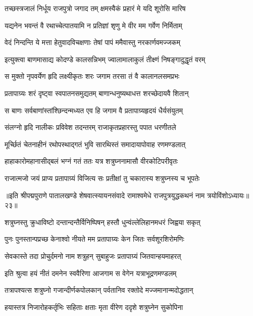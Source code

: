 \twolineshloka
{तच्छस्त्रजालं निर्धूय राजपुत्रो जगाद तम्}
{क्षमस्वैकं प्रहारं मे यदि शूरोसि मारिष}%

\twolineshloka
{यद्यनेन भवन्तं वै रथाच्चेत्पातयामि न}
{प्रतिज्ञां शृणु मे वीर मम गर्वेण निर्मिताम्}%

\twolineshloka
{वेदं निन्दन्ति ये मत्ता हेतुवादविचक्षणाः}
{तेषां पापं ममैवास्तु नरकार्णवमज्जकम्}%

\twolineshloka
{इत्युक्त्वा बाणमासाद्य कोदण्डे कालसन्निभम्}
{ज्वालामालाकुलं तीक्ष्णं निषङ्गादुद्धृतं वरम्}%

\twolineshloka
{स मुक्तो नृपवर्येण हृदि लक्ष्यीकृतः शरः}
{जगाम तरसा तं वै कालानलसमप्रभः}%

\twolineshloka
{प्रतापाग्र्यः शरं दृष्ट्वा स्वपातनसमुद्यतम्}
{बाणान्धनुष्यथाधत्त शरच्छेदायवै शितान्}%

\twolineshloka
{स बाणः सर्वबाणांस्तांश्छिन्दन्मध्यत एव हि}
{जगाम वै प्रतापाग्र्यहृदयं धैर्यसंयुतम्}%

\twolineshloka
{संलग्नो हृदि नालीकः प्रविवेश तदन्तरम्}
{राजाकृतप्रहारस्तु पपात धरणीतले}%

\twolineshloka
{मूर्च्छितं चेतनाहीनं रथोपस्थाद्गतं भुवि}
{सारथिस्तं समादायापोवाह रणमण्डलात्}%

\twolineshloka
{हाहाकारोमहानासीद्बलं भग्नं गतं ततः}
{यत्र शत्रुघ्ननामासौ वीरकोटिपरीवृतः}%

\twolineshloka
{राजात्मजो जयं प्राप्य प्रतापाग्र्यं विजित्य सः}
{प्रतीक्षां तु चकारास्य शत्रुघ्नस्य च भूपतेः}%

{॥इति श्रीपद्मपुराणे पातालखण्डे शेषवात्स्यायनसंवादे रामाश्वमेधे राजपुत्रयुद्धकथनं नाम त्रयोविंशोऽध्यायः॥२३॥}



\twolineshloka
{शत्रुघ्नस्तु क्रुधाविष्टो दन्तान्दन्तैर्विनिष्पिषन्}
{हस्तौ धुन्वंल्लेलिहानमधरं जिह्वया सकृत्}%

\twolineshloka
{पुनः पुनस्तान्पप्रच्छ केनाश्वो नीयते मम}
{प्रतापाग्र्यः केन जितः सर्वशूरशिरोमणिः}%

\twolineshloka
{सेवकास्ते तदा प्रोचुर्दमनो नाम शत्रुहन्}
{सुबाहुजः प्रतापाग्र्यं जितवान्हयमाहरत्}%

\twolineshloka
{इति श्रुत्वा हयं नीतं दमनेन स्ववैरिणा}
{आजगाम स वेगेन यत्राभूद्रणमण्डलम्}%

\twolineshloka
{तत्रापश्यत्स शत्रुघ्नो गजान्दीर्णकपोलकान्}
{पर्वतानिव रक्तोदे मज्जमानान्मदोद्धतान्}%

\twolineshloka
{हयास्तत्र निजारोहकर्तृभिः सहिताः क्षताः}
{मृता वीरेण ददृशे शत्रुघ्नेन सुकोपिना}%

